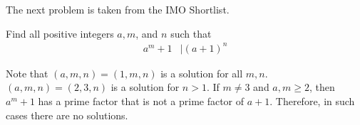 \documentclass{subfile}
\begin{document}
			The next problem is taken from the IMO Shortlist.
		\begin{problem}
			Find all positive integers $a,m$, and $n$ such that
				\begin{align*}
					a^m+1 & \mid (a+1)^n
				\end{align*}
		\end{problem}

		\begin{solution}
			Note that $(a,m,n)=(1,m,n)$ is a solution for all $m,n$. $(a,m,n)=(2,3,n)$ is a solution for $n>1$. If $m\neq3$ and $a,m\geq2$, then $a^m+1$ has a prime factor that is not a prime factor of $a+1$. Therefore, in such cases there are no solutions.
		\end{solution}
\end{document}

